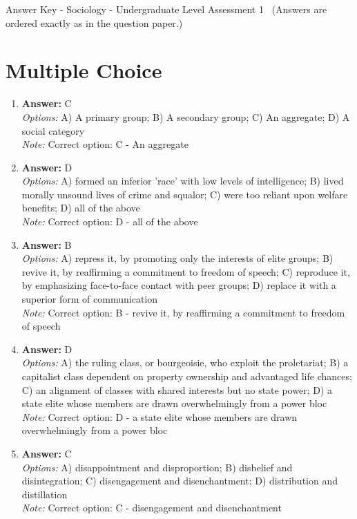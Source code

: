 \documentclass[12pt]{article}
\begin{document}
\begin{center}
Answer Key - Sociology - Undergraduate Level Assessment 1 \
\small (Answers are ordered exactly as in the question paper.)
\end{center}

\section*{Multiple Choice}
\begin{enumerate}[label=\arabic*.]
\item \textbf{Answer:} C
\\ \textit{Options:} A) A primary group; B) A secondary group; C) An aggregate; D) A social category
\\ \textit{Note:} Correct option: C - An aggregate
\item \textbf{Answer:} D
\\ \textit{Options:} A) formed an inferior 'race' with low levels of intelligence; B) lived morally unsound lives of crime and squalor; C) were too reliant upon welfare benefits; D) all of the above
\\ \textit{Note:} Correct option: D - all of the above
\item \textbf{Answer:} B
\\ \textit{Options:} A) repress it, by promoting only the interests of elite groups; B) revive it, by reaffirming a commitment to freedom of speech; C) reproduce it, by emphasizing face-to-face contact with peer groups; D) replace it with a superior form of communication
\\ \textit{Note:} Correct option: B - revive it, by reaffirming a commitment to freedom of speech
\item \textbf{Answer:} D
\\ \textit{Options:} A) the ruling class, or bourgeoisie, who exploit the proletariat; B) a capitalist class dependent on property ownership and advantaged life chances; C) an alignment of classes with shared interests but no state power; D) a state elite whose members are drawn overwhelmingly from a power bloc
\\ \textit{Note:} Correct option: D - a state elite whose members are drawn overwhelmingly from a power bloc
\item \textbf{Answer:} C
\\ \textit{Options:} A) disappointment and disproportion; B) disbelief and disintegration; C) disengagement and disenchantment; D) distribution and distillation
\\ \textit{Note:} Correct option: C - disengagement and disenchantment
\end{enumerate}
\end{document}
